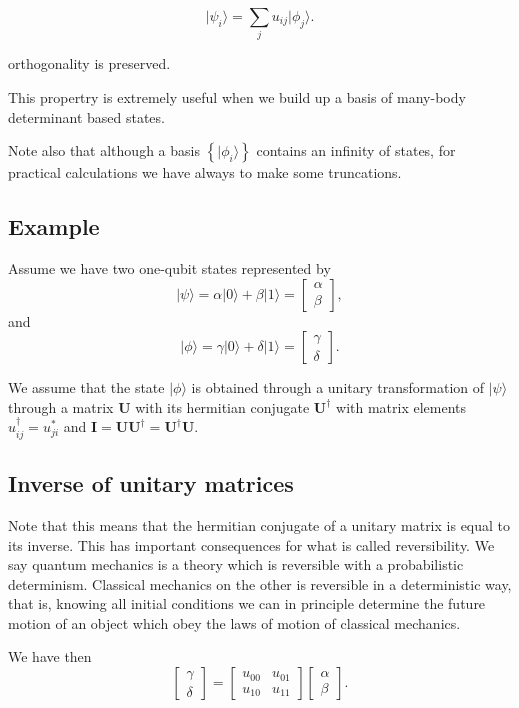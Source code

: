 \[
\vert \psi_i\rangle = \sum_{j} u_{ij}\vert \phi_{j}\rangle.
\]

orthogonality is preserved.

This propertry is extremely useful when we build up a basis of
many-body determinant based states.

Note also that although a basis $\left\{\vert \phi_i \rangle\right\}$ contains an infinity of states, for practical calculations we have always to make some truncations.

\subsection{Example}

Assume we have two one-qubit states represented by
\[
\vert \psi \rangle = \alpha \vert 0 \rangle + \beta \vert 1\rangle=\begin{bmatrix}\alpha \\ \beta \end{bmatrix},
\]
and
\[
\vert \phi \rangle = \gamma \vert 0 \rangle + \delta \vert 1\rangle=\begin{bmatrix}\gamma \\ \delta \end{bmatrix}.
\]

We assume that the state $\vert \phi \rangle$ is obtained through a
unitary transformation of $\vert \psi \rangle$ through a matrix
$\bm{U}$ with its hermitian conjugate $\bm{U}^{\dagger}$ with matrix
elements $u_{ij}^{\dagger}=u_{ji}^*$ and
$\bm{I}=\bm{U}\bm{U}^{\dagger}=\bm{U}^{\dagger}\bm{U}$.

\subsection{Inverse of unitary matrices}

Note that this means that the hermitian conjugate of a unitary matrix
is equal to its inverse. This has important consequences for what is
called reversibility. We say quantum mechanics is a theory which is
reversible with a probabilistic determinism. Classical mechanics on
the other is reversible in a deterministic way, that is, knowing all
initial conditions we can in principle determine the future motion of
an object which obey the laws of motion of classical mechanics.

We have then
\[
\begin{bmatrix}\gamma \\ \delta \end{bmatrix}=\begin{bmatrix}u_{00} & u_{01} \\ u_{10} & u_{11} \end{bmatrix}\begin{bmatrix}\alpha \\ \beta \end{bmatrix}.
\]

